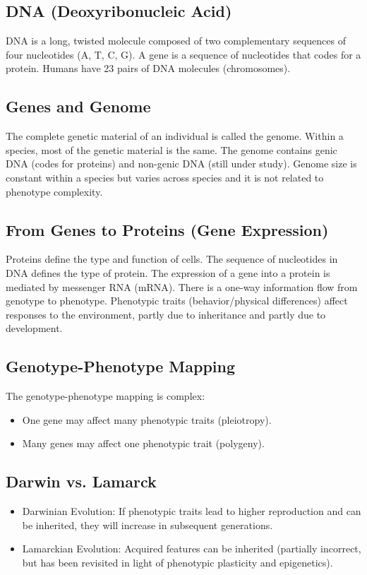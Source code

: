 \subsection*{DNA (Deoxyribonucleic Acid)}
DNA is a long, twisted molecule composed of two complementary sequences of four nucleotides (A, T, C, G). A gene is a sequence of nucleotides that codes for a protein. Humans have 23 pairs of DNA molecules (chromosomes).

\subsection*{Genes and Genome}
The complete genetic material of an individual is called the genome.  Within a species, most of the genetic material is the same. The genome contains genic DNA (codes for proteins) and non-genic DNA (still under study). Genome size is constant within a species but varies across species and it is not related to phenotype complexity.

\subsection*{From Genes to Proteins (Gene Expression)}
Proteins define the type and function of cells. The sequence of nucleotides in DNA defines the type of protein. The expression of a gene into a protein is mediated by messenger RNA (mRNA). There is a one-way information flow from genotype to phenotype. Phenotypic traits (behavior/physical differences) affect responses to the environment, partly due to inheritance and partly due to development.

\subsection*{Genotype-Phenotype Mapping}
The genotype-phenotype mapping is complex:
\begin{itemize}
    \item One gene may affect many phenotypic traits (pleiotropy).
    \item Many genes may affect one phenotypic trait (polygeny).
\end{itemize}

\subsection*{Darwin vs. Lamarck}
\begin{itemize}
    \item Darwinian Evolution: If phenotypic traits lead to higher reproduction and can be inherited, they will increase in subsequent generations.
    \item Lamarckian Evolution: Acquired features can be inherited (partially incorrect, but has been revisited in light of phenotypic plasticity and epigenetics).
\end{itemize}

